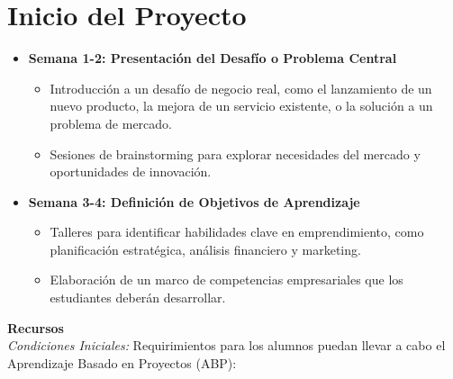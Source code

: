 \newpage
\section{Inicio del Proyecto}
\begin{itemize}
  \item \textbf{Semana 1-2: Presentación del Desafío o Problema Central}
  \begin{itemize}
    \item Introducción a un desafío de negocio real, como el lanzamiento de un nuevo producto, la mejora de un servicio existente, o la solución a un problema de mercado.
    \item Sesiones de brainstorming para explorar necesidades del mercado y oportunidades de innovación.
  \end{itemize}
  \item \textbf{Semana 3-4: Definición de Objetivos de Aprendizaje}
  \begin{itemize}
    \item Talleres para identificar habilidades clave en emprendimiento, como planificación estratégica, análisis financiero y marketing.
    \item Elaboración de un marco de competencias empresariales que los estudiantes deberán desarrollar.
  \end{itemize}
\end{itemize}
{\large \textbf{Recursos}}\\
\textit{Condiciones Iniciales:} Requirimientos para los alumnos puedan llevar a cabo el Aprendizaje Basado en Proyectos (ABP):
